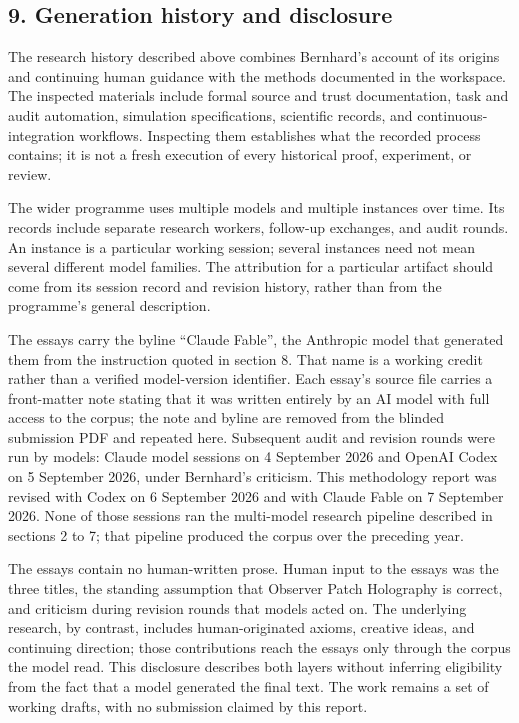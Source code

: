 \documentclass[
  11pt,
]{article}
\begin{document}
\subsection{9. Generation history and
disclosure}\label{generation-history-and-disclosure}

The research history described above combines Bernhard's account of its
origins and continuing human guidance with the methods documented in the
workspace. The inspected materials include formal source and trust
documentation, task and audit automation, simulation specifications,
scientific records, and continuous-integration workflows. Inspecting
them establishes what the recorded process contains; it is not a fresh
execution of every historical proof, experiment, or review.

The wider programme uses multiple models and multiple instances over
time. Its records include separate research workers, follow-up
exchanges, and audit rounds. An instance is a particular working
session; several instances need not mean several different model
families. The attribution for a particular artifact should come from its
session record and revision history, rather than from the programme's
general description.

The essays carry the byline ``Claude Fable'', the Anthropic model that
generated them from the instruction quoted in section 8. That name is a
working credit rather than a verified model-version identifier. Each
essay's source file carries a front-matter note stating that it was
written entirely by an AI model with full access to the corpus; the note
and byline are removed from the blinded submission PDF and repeated
here. Subsequent audit and revision rounds were run by models: Claude
model sessions on 4 September 2026 and OpenAI Codex on 5 September 2026,
under Bernhard's criticism. This methodology report was revised with
Codex on 6 September 2026 and with Claude Fable on 7 September 2026.
None of those sessions ran the multi-model research pipeline described
in sections 2 to 7; that pipeline produced the corpus over the preceding
year.

The essays contain no human-written prose. Human input to the essays was
the three titles, the standing assumption that Observer Patch Holography
is correct, and criticism during revision rounds that models acted on.
The underlying research, by contrast, includes human-originated axioms,
creative ideas, and continuing direction; those contributions reach the
essays only through the corpus the model read. This disclosure describes
both layers without inferring eligibility from the fact that a model
generated the final text. The work remains a set of working drafts, with
no submission claimed by this report.
\end{document}
